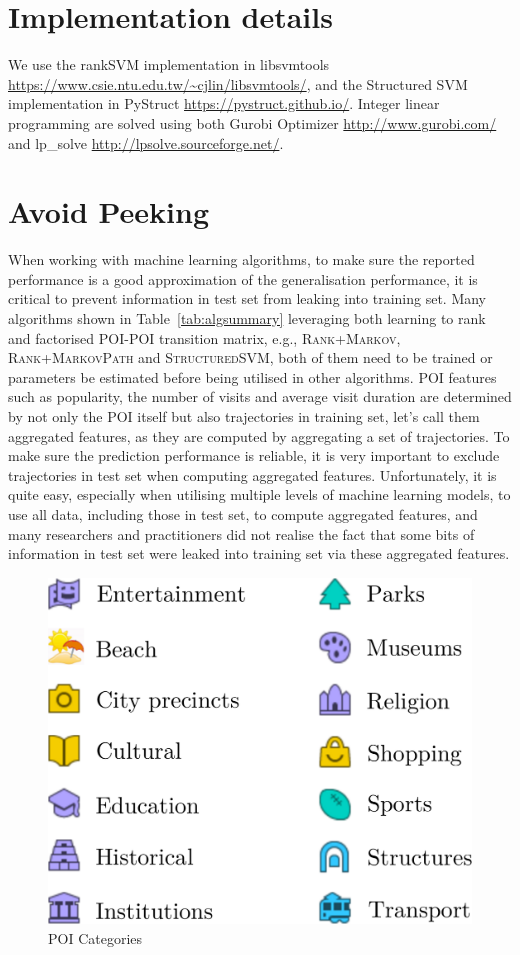 \section{Implementation details}
We use the rankSVM implementation in libsvmtools \url{https://www.csie.ntu.edu.tw/~cjlin/libsvmtools/},
and the Structured SVM implementation in PyStruct \url{https://pystruct.github.io/}.
Integer linear programming are solved using both Gurobi Optimizer \url{http://www.gurobi.com/} 
and lp\_solve \url{http://lpsolve.sourceforge.net/}.


\section{Avoid Peeking}
When working with machine learning algorithms, to make sure the reported performance is a good approximation
of the generalisation performance, it is critical to prevent information in test set from leaking into
training set.
Many algorithms shown in Table~\ref{tab:algsummary} leveraging both learning to rank and 
factorised POI-POI transition matrix,
e.g., \textsc{Rank+Markov}, \textsc{Rank+MarkovPath} and \textsc{StructuredSVM},
both of them need to be trained or parameters be estimated before being utilised in other algorithms.
POI features such as popularity, the number of visits and average visit duration are
determined by not only the POI itself but also trajectories in training set, 
let's call them aggregated features, as they are computed by aggregating a set of trajectories.
To make sure the prediction performance is reliable, 
it is very important to exclude trajectories in test set when computing aggregated features.
Unfortunately, it is quite easy, especially when utilising multiple levels of machine learning models,
to use all data, including those in test set, to compute aggregated features, 
and many researchers and practitioners did not realise the fact that 
some bits of information in test set were leaked into training set via these aggregated features.



\begin{figure}[t]
	\centering
	\includegraphics[width=0.6\columnwidth]{fig/poi_cats.pdf}
	\caption{POI Categories}
	\label{fig:poicats}
\end{figure}


